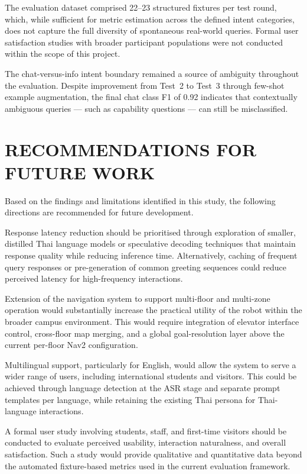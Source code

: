 The evaluation dataset comprised 22--23 structured fixtures per test round, which, while sufficient for metric estimation across the defined intent categories, does not capture the full diversity of spontaneous real-world queries. Formal user satisfaction studies with broader participant populations were not conducted within the scope of this project.

The chat-versus-info intent boundary remained a source of ambiguity throughout the evaluation. Despite improvement from Test~2 to Test~3 through few-shot example augmentation, the final chat class F1 of 0.92 indicates that contextually ambiguous queries — such as capability questions — can still be misclassified.

\section{RECOMMENDATIONS FOR FUTURE WORK}

Based on the findings and limitations identified in this study, the following directions are recommended for future development.

Response latency reduction should be prioritised through exploration of smaller, distilled Thai language models or speculative decoding techniques that maintain response quality while reducing inference time. Alternatively, caching of frequent query responses or pre-generation of common greeting sequences could reduce perceived latency for high-frequency interactions.

Extension of the navigation system to support multi-floor and multi-zone operation would substantially increase the practical utility of the robot within the broader campus environment. This would require integration of elevator interface control, cross-floor map merging, and a global goal-resolution layer above the current per-floor Nav2 configuration.

Multilingual support, particularly for English, would allow the system to serve a wider range of users, including international students and visitors. This could be achieved through language detection at the ASR stage and separate prompt templates per language, while retaining the existing Thai persona for Thai-language interactions.

A formal user study involving students, staff, and first-time visitors should be conducted to evaluate perceived usability, interaction naturalness, and overall satisfaction. Such a study would provide qualitative and quantitative data beyond the automated fixture-based metrics used in the current evaluation framework.

